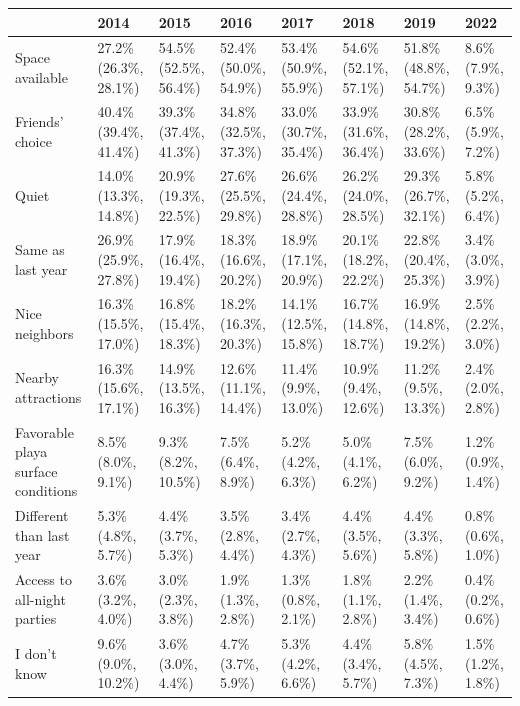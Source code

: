 \documentclass[
]{book}
\begin{document}
\begin{table}
\centering
\begin{tabular}[t]{>{}l|>{}l|>{}l|>{}l|>{}l|>{}l|>{}l|>{}l}
\hline
  & 2014 & 2015 & 2016 & 2017 & 2018 & 2019 & 2022\\
\hline
Space available & 27.2\% (26.3\%, 28.1\%) & 54.5\% (52.5\%, 56.4\%) & 52.4\% (50.0\%, 54.9\%) & 53.4\% (50.9\%, 55.9\%) & 54.6\% (52.1\%, 57.1\%) & 51.8\% (48.8\%, 54.7\%) & 8.6\% (7.9\%, 9.3\%)\\
\hline
Friends' choice & 40.4\% (39.4\%, 41.4\%) & 39.3\% (37.4\%, 41.3\%) & 34.8\% (32.5\%, 37.3\%) & 33.0\% (30.7\%, 35.4\%) & 33.9\% (31.6\%, 36.4\%) & 30.8\% (28.2\%, 33.6\%) & 6.5\% (5.9\%, 7.2\%)\\
\hline
Quiet & 14.0\% (13.3\%, 14.8\%) & 20.9\% (19.3\%, 22.5\%) & 27.6\% (25.5\%, 29.8\%) & 26.6\% (24.4\%, 28.8\%) & 26.2\% (24.0\%, 28.5\%) & 29.3\% (26.7\%, 32.1\%) & 5.8\% (5.2\%, 6.4\%)\\
\hline
Same as last year & 26.9\% (25.9\%, 27.8\%) & 17.9\% (16.4\%, 19.4\%) & 18.3\% (16.6\%, 20.2\%) & 18.9\% (17.1\%, 20.9\%) & 20.1\% (18.2\%, 22.2\%) & 22.8\% (20.4\%, 25.3\%) & 3.4\% (3.0\%, 3.9\%)\\
\hline
Nice neighbors & 16.3\% (15.5\%, 17.0\%) & 16.8\% (15.4\%, 18.3\%) & 18.2\% (16.3\%, 20.3\%) & 14.1\% (12.5\%, 15.8\%) & 16.7\% (14.8\%, 18.7\%) & 16.9\% (14.8\%, 19.2\%) & 2.5\% (2.2\%, 3.0\%)\\
\hline
Nearby attractions & 16.3\% (15.6\%, 17.1\%) & 14.9\% (13.5\%, 16.3\%) & 12.6\% (11.1\%, 14.4\%) & 11.4\% (9.9\%, 13.0\%) & 10.9\% (9.4\%, 12.6\%) & 11.2\% (9.5\%, 13.3\%) & 2.4\% (2.0\%, 2.8\%)\\
\hline
Favorable playa surface conditions & 8.5\% (8.0\%, 9.1\%) & 9.3\% (8.2\%, 10.5\%) & 7.5\% (6.4\%, 8.9\%) & 5.2\% (4.2\%, 6.3\%) & 5.0\% (4.1\%, 6.2\%) & 7.5\% (6.0\%, 9.2\%) & 1.2\% (0.9\%, 1.4\%)\\
\hline
Different than last year & 5.3\% (4.8\%, 5.7\%) & 4.4\% (3.7\%, 5.3\%) & 3.5\% (2.8\%, 4.4\%) & 3.4\% (2.7\%, 4.3\%) & 4.4\% (3.5\%, 5.6\%) & 4.4\% (3.3\%, 5.8\%) & 0.8\% (0.6\%, 1.0\%)\\
\hline
Access to all-night parties & 3.6\% (3.2\%, 4.0\%) & 3.0\% (2.3\%, 3.8\%) & 1.9\% (1.3\%, 2.8\%) & 1.3\% (0.8\%, 2.1\%) & 1.8\% (1.1\%, 2.8\%) & 2.2\% (1.4\%, 3.4\%) & 0.4\% (0.2\%, 0.6\%)\\
\hline
I don't know & 9.6\% (9.0\%, 10.2\%) & 3.6\% (3.0\%, 4.4\%) & 4.7\% (3.7\%, 5.9\%) & 5.3\% (4.2\%, 6.6\%) & 4.4\% (3.4\%, 5.7\%) & 5.8\% (4.5\%, 7.3\%) & 1.5\% (1.2\%, 1.8\%)\\
\hline
\end{tabular}
\end{table}
\end{document}
